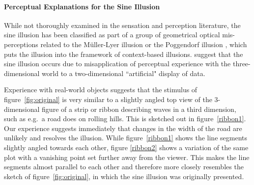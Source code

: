 \documentclass[12pt]{article}\usepackage[]{graphicx}\usepackage[]{color}
\begin{document}
%

\paragraph{Perceptual Explanations for the Sine Illusion}\label{perceptualexplanations}\hfill\newline
While not thoroughly examined in the sensation and perception literature, the sine illusion has been classified as part of a group of geometrical optical mis-perceptions  related to the M\"uller-Lyer illusion \citep{day:1991} or the Poggendorf illusion \citep{poggendorf}, which puts the illusion into the framework of context-based illusions. \cite{day:1991} suggest that the sine illusion occurs due to misapplication of perceptual experience with the three-dimensional world to a two-dimensional ``artificial" display of data.  

Experience with real-world objects suggests that the stimulus of figure~\ref{fig:original} is very similar to a slightly angled top view of the 3-dimensional figure of a strip or ribbon describing waves in a third dimension, such as e.g.~a road does on rolling hills. This is sketched out in figure~\ref{ribbon1}. Our experience suggests immediately that changes in the width of the road are unlikely and resolves the illusion. While figure~\ref{ribbon1} shows the line segments slightly angled towards each other, figure \ref{ribbon2} shows a variation of the same plot with a  vanishing point set further away from the viewer. This makes the line segments almost parallel to each other and therefore more closely resembles the sketch of figure~\ref{fig:original}, in which the sine illusion was originally presented.
\end{document}
